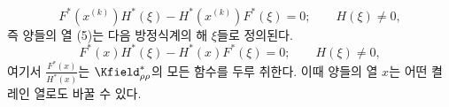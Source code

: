 
\[
F^*(x^{(k)})H^*(\xi)-H^*(x^{(k)})F^*(\xi)=0;\qquad H(\xi)\ne0,
\]
즉 양들의 열 (5)는 다음 방정식계의 해 $\xi$들로 정의된다.
\[
F^*(x)H^*(\xi)-H^*(x)F^*(\xi)=0;\qquad H(\xi)\ne0,
\]
여기서 $\frac{F^*(x)}{H^*(x)}$는 $\Kfield^*_{\rho\rho}$의 모든 함수를 두루 취한다. 이때 양들의 열 $x$는 어떤 켤레인 열로도 바꿀 수 있다.
